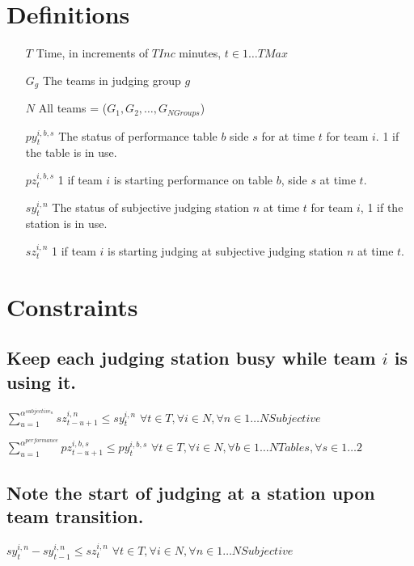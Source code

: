 \documentclass[letterpaper,11pt]{report}
\begin{document}
\section{Definitions}
\begin{itemize}

\item[$T$] Time, in increments of $TInc$ minutes, $t \in 1 \dots TMax$

\item[$G_{g}$] The teams in judging group $g$
\item[$N$] All teams = ($G_{1}, G_{2}, \dots, G_{NGroups}$)

\item[$py_{t}^{i,b,s}$] The status of performance table $b$ side $s$ for
at  time $t$ for team $i$. 1 if the table is in use.  

\item[$pz_{t}^{i,b,s}$] 1 if team $i$ is starting performance on table $b$,
  side $s$ at time $t$.

\item[$sy_{t}^{i,n}$] The status of subjective judging station $n$ at time $t$ for team
  $i$, 1 if the station is in use.

\item[$sz_{t}^{i,n}$] 1 if team $i$ is starting judging at subjective
judging station $n$ at time $t$.


\end{itemize}


\section{Constraints}

\subsection{Keep each judging station busy while team $i$ is using it.}

$\sum\limits_{u=1}^{\alpha^{subjective_{n}}} sz_{t-u+1}^{i,n} \le sy_{t}^{i,n}$
\hfill $\forall t \in T,  \forall i \in N,
\forall n \in 1 \dots NSubjective$

$\sum\limits_{u=1}^{\alpha^{performance}} pz_{t-u+1}^{i,b,s} \le py_{t}^{i,b,s}$
\hfill $\forall t \in T, \forall i \in N, \forall b \in 1 \dots NTables,
\forall s \in 1 \dots 2$


\subsection{Note the start of judging at a station upon team transition.}
$sy_{t}^{i,n} - sy_{t-1}^{i,n} \le sz_{t}^{i,n}$
\hfill $\forall t \in T, \forall i \in N,
\forall n \in 1 \dots NSubjective$
\end{document}
